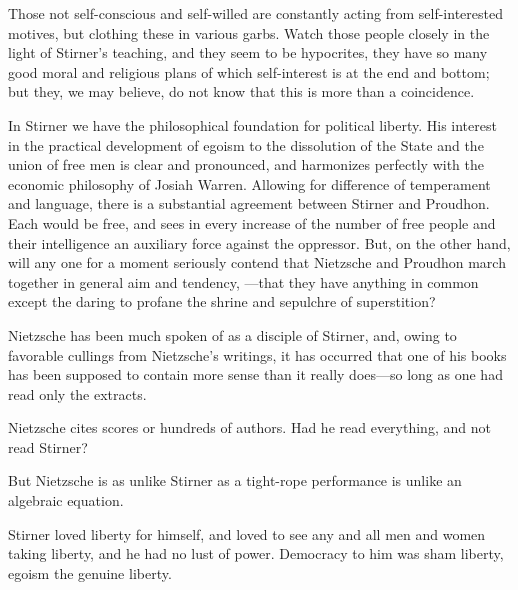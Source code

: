 Those not self-conscious and self-willed are constantly acting from 
self-interested motives, but clothing these in various garbs. Watch those 
people closely in the light of Stirner's teaching, and they seem to be 
hypocrites, they have so many good moral and religious plans of which 
self-interest is at the end and bottom; but they, we may believe, do not know 
that this is more than a coincidence.

In Stirner we have the philosophical foundation for political liberty. His 
interest in the practical development of egoism to the dissolution of the 
State and the union of free men is clear and pronounced, and harmonizes 
perfectly with the economic philosophy of Josiah Warren. Allowing for 
difference of temperament and language, there is a substantial agreement 
between Stirner and Proudhon. Each would be free, and sees in every increase 
of the number of free people and their intelligence an auxiliary force against 
the oppressor. But, on the other hand, will any one for a moment seriously 
contend that Nietzsche and Proudhon march together in general aim and 
tendency, ---that they have anything in common except the daring to profane 
the shrine and sepulchre of superstition?

Nietzsche has been much spoken of as a disciple of Stirner, and, owing to 
favorable cullings from Nietzsche's writings, it has occurred that one of his 
books has been supposed to contain more sense than it really does---so long 
as one had read only the extracts.

Nietzsche cites scores or hundreds of authors. Had he read everything, and not 
read Stirner?

But Nietzsche is as unlike Stirner as a tight-rope performance is unlike an 
algebraic equation.

Stirner loved liberty for himself, and loved to see any and all men and women 
taking liberty, and he had no lust of power. Democracy to him was sham 
liberty, egoism the genuine liberty.

